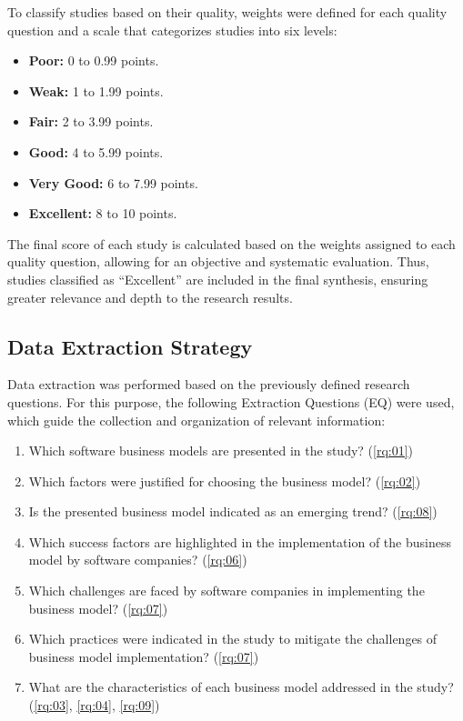 \documentclass[journal]{IEEEtran}
\begin{document}
To classify studies based on their quality, weights were defined for each quality question and a scale that categorizes studies into six levels:

\begin{itemize}
    \item \textbf{Poor:} 0 to 0.99 points.
    \item \textbf{Weak:} 1 to 1.99 points.
    \item \textbf{Fair:} 2 to 3.99 points.
    \item \textbf{Good:} 4 to 5.99 points.
    \item \textbf{Very Good:} 6 to 7.99 points.
    \item \textbf{Excellent:} 8 to 10 points.
\end{itemize}

The final score of each study is calculated based on the weights assigned to each quality question, allowing for an objective and systematic evaluation. Thus, studies classified as ``Excellent'' are included in the final synthesis, ensuring greater relevance and depth to the research results.

\subsection{Data Extraction Strategy}\label{sec:data-extraction-strategy}

Data extraction was performed based on the previously defined research questions.
For this purpose, the following Extraction Questions (EQ) were used, which guide the collection and organization of relevant information:

\begin{enumerate}[label=\textbf{EQ\arabic*.}]
    \item Which software business models are presented in the study? (\ref{rq:01})
    \item Which factors were justified for choosing the business model? (\ref{rq:02})
    \item Is the presented business model indicated as an emerging trend? (\ref{rq:08})
    \item Which success factors are highlighted in the implementation of the business model by software companies? (\ref{rq:06})
    \item Which challenges are faced by software companies in implementing the business model? (\ref{rq:07})
    \item Which practices were indicated in the study to mitigate the challenges of business model implementation? (\ref{rq:07})
    \item What are the characteristics of each business model addressed in the study? (\ref{rq:03}, \ref{rq:04}, \ref{rq:09})
\end{enumerate}
\end{document}
